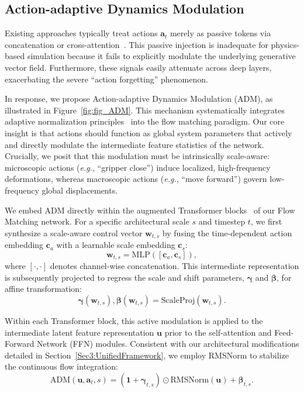 \subsection{Action-adaptive Dynamics Modulation}
\label{Sec3:ActionModulation}
Existing approaches typically treat actions $\boldsymbol{a}_t$ merely as passive tokens via concatenation or cross-attention~\cite{mou2024t2i, wang2025sampo}. This passive injection is inadequate for physics-based simulation because it fails to explicitly modulate the underlying generative vector field. Furthermore, these signals easily attenuate across deep layers, exacerbating the severe ``action forgetting'' phenomenon.

In response, we propose Action-adaptive Dynamics Modulation (ADM), as illustrated in Figure~\ref{fig:fig_ADM}. This mechanism systematically integrates adaptive normalization principles~\cite{karras2019stylegan2, park2019semantic, yu2025pixeldit} into the flow matching paradigm. Our core insight is that actions should function as global system parameters that actively and directly modulate the intermediate feature statistics of the network. Crucially, we posit that this modulation must be intrinsically scale-aware: microscopic actions (\textit{e.g.}, ``gripper close'') induce localized, high-frequency deformations, whereas macroscopic actions (\textit{e.g.}, ``move forward'') govern low-frequency global displacements. 

We embed ADM directly within the augmented Transformer blocks~\cite{yao2025reconstruction} of our Flow Matching network. For a specific architectural scale $s$ and timestep $t$, we first synthesize a scale-aware control vector $\boldsymbol{w}_{t,s}$ by fusing the time-dependent action embedding $\boldsymbol{c}_a$ with a learnable scale embedding $\boldsymbol{c}_s$:
\begin{equation}
    \boldsymbol{w}_{t,s} = \text{MLP}([ \boldsymbol{c}_a, \boldsymbol{c}_s ]),
\end{equation}
where $[\cdot, \cdot]$ denotes channel-wise concatenation. This intermediate representation is subsequently projected to regress the scale and shift parameters, $\boldsymbol{\gamma}$ and $\boldsymbol{\beta}$, for affine transformation:
\begin{equation}
    \boldsymbol{\gamma}(\boldsymbol{w}_{t,s}), \boldsymbol{\beta}(\boldsymbol{w}_{t,s}) = \text{ScaleProj}(\boldsymbol{w}_{t,s}).
\end{equation}

Within each Transformer block, this active modulation is applied to the intermediate latent feature representation $\boldsymbol{u}$ prior to the self-attention and Feed-Forward Network (FFN) modules. Consistent with our architectural modifications detailed in Section~\ref{Sec3:UnifiedFramework}, we employ RMSNorm to stabilize the continuous flow integration:
\begin{equation}
    \text{ADM}(\boldsymbol{u}, \boldsymbol{a}_t, s) = (\boldsymbol{1} + \boldsymbol{\gamma}_{t,s}) \odot \text{RMSNorm}(\boldsymbol{u}) + \boldsymbol{\beta}_{t,s}.
\end{equation}

